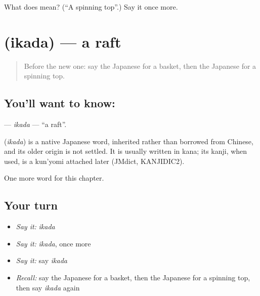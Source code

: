 \begin{tcolorbox}[breakable,colback=teal!4,colframe=teal!35!black,title={Before you move on}]
What does  mean? (\textquotedblleft{}A spinning top\textquotedblright{}.) Say it once more.
\end{tcolorbox}
\section[\texorpdfstring{\ja{いかだ} (ikada)}{いかだ (ikada)}]{ (ikada) — a raft}

\label{lesson:JA-C66-ikada}



\begin{quote}
Before the new one: say the Japanese for a basket, then the Japanese for a spinning top.
\end{quote}

\subsection*{You'll want to know: }
\textbf{} — \emph{ikada} — \textquotedblleft{}a raft\textquotedblright{}.

\begin{cousinweb}
\textbf{} (\emph{ikada}) is a native Japanese word, inherited rather than borrowed from Chinese, and its older origin is not settled. It is usually written in kana; its kanji, when used, is a kun'yomi attached later (JMdict, KANJIDIC2).
\end{cousinweb}

\begin{grammarlens}[title={What you've built}]
One more word for this chapter.
\end{grammarlens}

\subsection*{Your turn}
\begin{itemize}
\raggedright
  \item \emph{Say it:} \emph{ikada}
  \item \emph{Say it:} \emph{ikada}, once more
  \item \emph{Say it:} say \emph{ikada}
  \item \emph{Recall:} say the Japanese for a basket, then the Japanese for a spinning top, then say \emph{ikada} again
\end{itemize}

